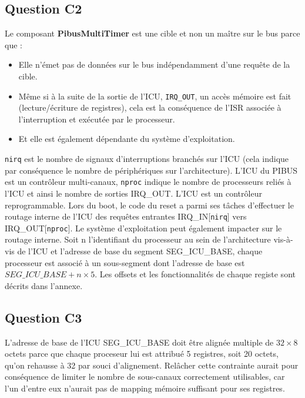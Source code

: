 \documentclass[10pt]{article}
\begin{document}
\subsection{Question C2}
Le composant {\bf PibusMultiTimer} est une cible et non un maître sur le bus
parce que :
\begin{itemize}
  \item Elle n'émet pas de données sur le bus indépendamment d'une requête
  de la cible.
  \item Même si à la suite de la sortie de l'ICU, \texttt{IRQ\_OUT}, un accès
  mémoire est fait (lecture/écriture de registres), cela est la conséquence
  de l'ISR associée à l'interruption et exécutée par le processeur.
  \item Et elle est également dépendante du système d'exploitation.
\end{itemize}
\texttt{nirq} est le nombre de signaux d'interruptions branchés sur l'ICU (cela
indique par conséquence le nombre de périphériques sur l'architecture).
\newline
L'ICU du PIBUS est un contrôleur multi-canaux, \texttt{nproc} indique le nombre
de processeurs reliés à l'ICU et ainsi le nombre de sorties IRQ\_OUT.
\newline
L'ICU est un contrôleur reprogrammable. Lors du boot, le code du reset a parmi
ses tâches d'effectuer le routage interne de l'ICU des requêtes entrantes
IRQ\_IN[\texttt{nirq}] vers IRQ\_OUT[\texttt{nproc}]. Le système d'exploitation
peut également impacter sur le routage interne.
\newline
Soit n l'identifiant du processeur au sein de l'architecture vis-à-vis de l'ICU
et l'adresse de base du segment SEG\_ICU\_BASE, chaque processeur est associé à
un sous-segment dont l'adresse de base est $SEG\_ICU\_BASE + n \times 5$. Les
offsets et les fonctionnalités de chaque registe sont décrits dans l'annexe.

\subsection{Question C3}
L'adresse de base de l'ICU SEG\_ICU\_BASE doit être alignée multiple de $32
\times 8$ octets parce que chaque proceseur lui est attribué 5 registres, soit
20 octets, qu'on rehausse à 32 par souci d'alignement. Relâcher cette
contrainte aurait pour conséquence de limiter le nombre de sous-canaux
correctement utilisables, car l'un d'entre eux n'aurait pas de mapping mémoire
suffisant pour ses registres.
\end{document}
